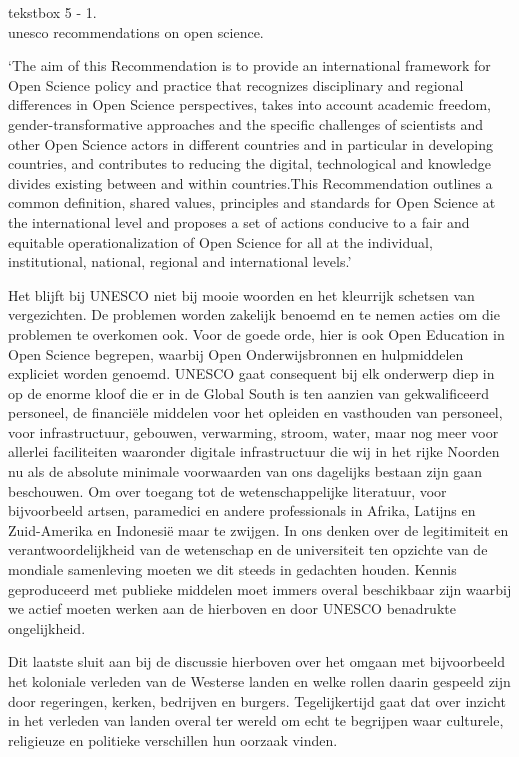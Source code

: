 \documentclass{jote-book}
\begin{document}
	\begin{bookbox}{\raggedright tekstbox 5 - 1. \\unesco recommendations on open science.}
		‘The aim of this Recommendation is to provide an international framework for Open Science policy and practice that recognizes disciplinary and regional differences in Open Science perspectives, takes into account academic freedom, gender-transformative approaches and the specific challenges of scientists and other Open Science actors in different countries and in particular in developing countries, and contributes to reducing the digital, technological and knowledge divides existing between and within countries.This Recommendation outlines a common definition, shared values, principles and standards for Open Science at the international level and proposes a set of actions conducive to a fair and equitable operationalization of Open Science for all at the individual, institutional, national, regional and international levels.'
	\end{bookbox}

	Het blijft bij UNESCO niet bij mooie woorden en het kleurrijk schetsen van vergezichten. De problemen worden zakelijk benoemd en te nemen acties om die problemen te overkomen ook. Voor de goede orde, hier is ook Open Education in Open Science begrepen, waarbij Open Onderwijsbronnen en hulpmiddelen expliciet worden genoemd. UNESCO gaat consequent bij elk onderwerp diep in op de enorme kloof die er in de Global South is ten aanzien van gekwalificeerd personeel, de financiële middelen voor het opleiden en vasthouden van personeel, voor infrastructuur, gebouwen, verwarming, stroom, water, maar nog meer voor allerlei faciliteiten waaronder digitale infrastructuur die wij in het rijke Noorden nu als de absolute minimale voorwaarden van ons dagelijks bestaan zijn gaan beschouwen. Om over toegang tot de wetenschappelijke literatuur, voor bijvoorbeeld artsen, paramedici en andere professionals in Afrika, Latijns en Zuid-Amerika en Indonesië maar te zwijgen. In ons denken over de legitimiteit en verantwoordelijkheid van de wetenschap en de universiteit ten opzichte van de mondiale samenleving moeten we dit steeds in gedachten houden. Kennis geproduceerd met publieke middelen moet immers overal beschikbaar zijn waarbij we actief moeten werken aan de hierboven en door UNESCO benadrukte ongelijkheid.



	Dit laatste sluit aan bij de discussie hierboven over het omgaan met bijvoorbeeld het koloniale verleden van de Westerse landen en welke rollen daarin gespeeld zijn door regeringen, kerken, bedrijven en burgers. Tegelijkertijd gaat dat over inzicht in het verleden van landen overal ter wereld om echt te begrijpen waar culturele, religieuze en politieke verschillen hun oorzaak vinden.
\end{document}

